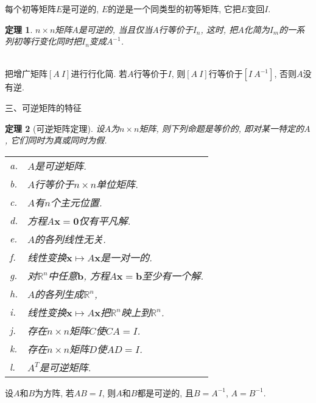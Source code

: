 \documentclass[UTF8,fontset=ubuntu]{ctexart}
\theoremstyle{plain}
\newtheorem{theorem}{定理}
\theoremstyle{nonumberplain}
\theoremstyle{empty}
\begin{document}
\begin{law}
每个初等矩阵$E$是可逆的, $E$的逆是一个同类型的初等矩阵, 它把$E$变回$I$.
\end{law}\vspace{2ex}

\begin{theorem}
$n\times n$矩阵$A$是可逆的, 当且仅当$A$行等价于$I_n$, 这时, 把$A$化简为$I_m$的一系列初等行变化同时把$I_n$变成$A^{-1}$.
\end{theorem}\vspace{2ex}

\begin{law}[求$A^{-1}$的算法]\ \\
把增广矩阵$[A\ I]$进行行化简. 若$A$行等价于$I$, 则$[A\ I]$行等价于$[I\ A^{-1}]$, 否则$A$没有逆.
\end{law}\vspace{6ex}

三、可逆矩阵的特征\\[-4ex]
\begin{theorem}[可逆矩阵定理]
设$A$为$n\times n$矩阵, 则下列命题是等价的, 即对某一特定的$A$, 它们同时为真或同时为假.\\
\begin{tabular}{l@{\ }l}
a. & $A$是可逆矩阵.\\
b. & $A$行等价于$n\times n$单位矩阵.\\
c. & $A$有$n$个主元位置.\\
d. & 方程$A\bm{x}=\bm{0}$仅有平凡解.\\
e. & $A$的各列线性无关.\\
f. & 线性变换$\bm{x}\mapsto A\bm{x}$是一对一的.\\
g. & 对$\mathbb{R}^n$中任意$\bm{b}$, 方程$A\bm{x}=\bm{b}$至少有一个解.\\
h. & $A$的各列生成$\mathbb{R}^n$,\\
i. & 线性变换$\bm{x}\mapsto A\bm{x}$把$\mathbb{R}^n$映上到$\mathbb{R}^n$.\\
j. & 存在$n\times n$矩阵$C$使$CA=I$.\\
k. & 存在$n\times n$矩阵$D$使$AD=I$.\\
l. & $A^T$是可逆矩阵.
\end{tabular}
\end{theorem}\vspace{2ex}

\begin{law}
设$A$和$B$为方阵, 若$AB=I$, 则$A$和$B$都是可逆的, 且$B=A^{-1}$, $A=B^{-1}$.
\end{law}\vspace{2ex}
\end{document}
